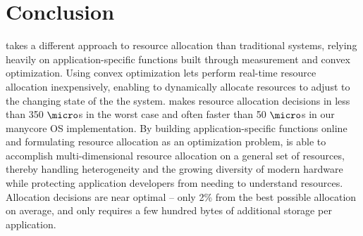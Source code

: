 \section{Conclusion}\label{conclusion}

\pacora takes a different approach to resource allocation than traditional systems, relying heavily on application-specific functions built through measurement and convex optimization.  Using convex optimization lets \pacora perform real-time resource allocation inexpensively, enabling \pacora to dynamically allocate resources to adjust to the changing state of the the system.  \pacora makes resource allocation decisions in less than 350 $\micro$s in the worst case and often faster than 50 $\micro$s in our manycore OS implementation. By building application-specific functions online and formulating resource allocation as an optimization problem, \pacora is able to accomplish multi-dimensional resource allocation on a general set of resources, thereby handling heterogeneity and the growing diversity of modern hardware while protecting application developers from needing to understand resources. Allocation decisions are near optimal -- only 2\% from the best possible allocation on average, and \pacora only requires a few hundred bytes of additional storage per application. 






